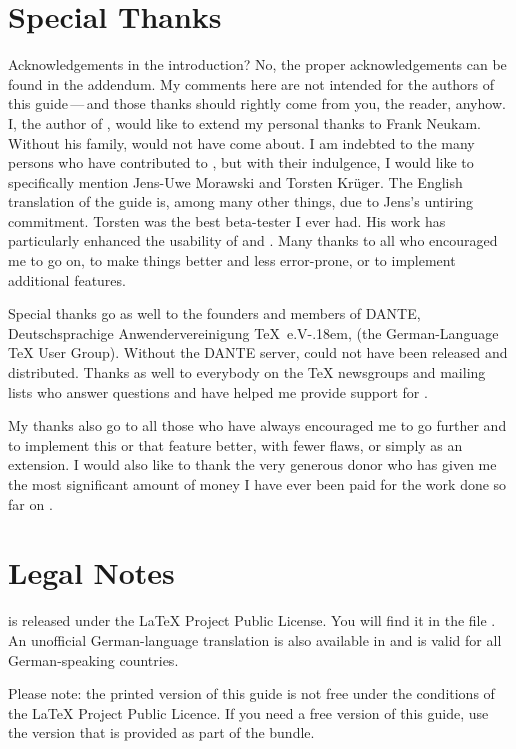 \section{Special Thanks}

Acknowledgements in the introduction? No, the proper acknowledgements can be
found in the addendum. My comments here are not intended for the authors of
this guide\,---\,and those thanks should rightly come from you, the reader,
anyhow. I, the author of {\KOMAScript}, would like to extend my personal
thanks to Frank Neukam.  Without his {\Script} family, {\KOMAScript} would not
have come about.  I am indebted to the many persons who have contributed to
{\KOMAScript}, but with their indulgence, I would like to specifically mention
Jens-Uwe Morawski and Torsten Kr\"uger. The English translation of the guide
is, among many other things, due to Jens's untiring commitment. Torsten was
the best beta-tester I ever had. His work has particularly enhanced the
usability of  and . Many thanks to all who
encouraged me to go on, to make things better and less error-prone, or to
implement additional features.

Special thanks go as well to the founders and members of DANTE,
Deutschsprachige Anwendervereinigung {\TeX}~e.V\kern-.18em, (the
German-Language {\TeX} User Group). Without the DANTE server, {\KOMAScript}
could not have been released and distributed. Thanks as well to everybody on
the {\TeX} newsgroups and mailing lists who answer questions and have helped
me provide support for {\KOMAScript}.

My thanks also go to all those who have always encouraged me to go further and
to implement this or that feature better, with fewer flaws, or simply as an
extension. I would also like to thank the very generous donor who has given me
the most significant amount of money I have ever been paid for the work done
so far on \KOMAScript{}.

\section{Legal Notes}

{\KOMAScript} is released under the {\LaTeX} Project Public License. You will
find it in the file . An unofficial German-language translation
is also available in  and is valid for all German-speaking
countries.

%
{Please note: the printed version of this guide is not free under the
  conditions of the {\LaTeX} Project Public Licence. If you need a free
  version of this guide, use the version that is provided as part of the
  {\KOMAScript} bundle.}


